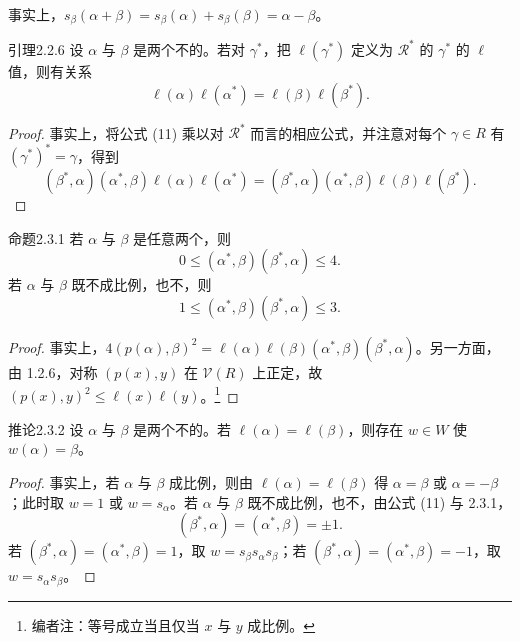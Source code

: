 事实上，$s_\beta(\alpha+\beta)=s_\beta(\alpha)+s_\beta(\beta)=\alpha-\beta$。
\begin{SGAresult}{引理}{2.2.6}
设 $\alpha$ 与 $\beta$ 是两个不的。若对 $\gamma^*$，把 $\ell(\gamma^*)$ 定义为 $\mathscr R^*$ 的 $\gamma^*$ 的 $\ell$ 值，则有关系
\[\ell(\alpha)\ell(\alpha^*)=\ell(\beta)\ell(\beta^*).\tag{12}\]
\end{SGAresult}
\begin{proof}
事实上，将公式 (11) 乘以对 $\mathscr R^*$ 而言的相应公式，并注意对每个 $\gamma\in R$ 有 $(\gamma^*)^*=\gamma$，得到
\[(\beta^*,\alpha)(\alpha^*,\beta)\ell(\alpha)\ell(\alpha^*)=(\beta^*,\alpha)(\alpha^*,\beta)\ell(\beta)\ell(\beta^*).\]
\end{proof}
\begin{SGAresult}{命题}{2.3.1}
若 $\alpha$ 与 $\beta$ 是任意两个，则
\[0\leq(\alpha^*,\beta)(\beta^*,\alpha)\leq4.\tag{13}\]
若 $\alpha$ 与 $\beta$ 既不成比例，也不，则
\[1\leq(\alpha^*,\beta)(\beta^*,\alpha)\leq3.\]
\end{SGAresult}
\begin{proof}
事实上，$4(p(\alpha),\beta)^2=\ell(\alpha)\ell(\beta)(\alpha^*,\beta)(\beta^*,\alpha)$。另一方面，由 1.2.6，对称 $(p(x),y)$ 在 $\mathscr V(R)$ 上正定，故 $(p(x),y)^2\leq\ell(x)\ell(y)$。\footnote{编者注：等号成立当且仅当 $x$ 与 $y$ 成比例。}
\end{proof}
\begin{SGAresult}{推论}{2.3.2}
设 $\alpha$ 与 $\beta$ 是两个不的。若 $\ell(\alpha)=\ell(\beta)$，则存在 $w\in W$ 使 $w(\alpha)=\beta$。
\end{SGAresult}
\begin{proof}
事实上，若 $\alpha$ 与 $\beta$ 成比例，则由 $\ell(\alpha)=\ell(\beta)$ 得 $\alpha=\beta$ 或 $\alpha=-\beta$；此时取 $w=1$ 或 $w=s_\alpha$。若 $\alpha$ 与 $\beta$ 既不成比例，也不，由公式 (11) 与 2.3.1，
\[(\beta^*,\alpha)=(\alpha^*,\beta)=\pm1.\]
若 $(\beta^*,\alpha)=(\alpha^*,\beta)=1$，取 $w=s_\beta s_\alpha s_\beta$；若 $(\beta^*,\alpha)=(\alpha^*,\beta)=-1$，取 $w=s_\alpha s_\beta$。
\end{proof}

